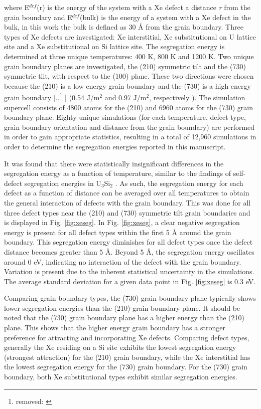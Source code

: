 \documentclass[review]{elsarticle}
\providecommand{\DIFaddtex}[1]{{\protect\color{blue} \sf #1}} %
\providecommand{\DIFdeltex}[1]{{\protect\color{red} [..\footnote{removed: #1} ]}} %
\providecommand{\DIFaddbegin}{} %
\providecommand{\DIFaddend}{} %
\providecommand{\DIFdelbegin}{} %
\providecommand{\DIFdelend}{} %
\providecommand{\DIFadd}[1]{\texorpdfstring{\DIFaddtex{#1}}{#1}} %
\providecommand{\DIFdel}[1]{\texorpdfstring{\DIFdeltex{#1}}{}} %
\newcommand{\DIFscaledelfig}{0.5}
\newlength{\DIFdelgraphicswidth} %
\newlength{\DIFdelgraphicsheight} %
\newcommand{\DIFaddincludegraphics}[2][]{{\color{blue}\fbox{\DIFOincludegraphics[#1]{#2}}}} %
\newcommand{\DIFdelincludegraphics}[2][]{%
\sbox{\DIFdelgraphicsbox}{\DIFOincludegraphics[#1]{#2}}%
\settoboxwidth{\DIFdelgraphicswidth}{\DIFdelgraphicsbox} %
\settoboxtotalheight{\DIFdelgraphicsheight}{\DIFdelgraphicsbox} %
\scalebox{\DIFscaledelfig}{%
\parbox[b]{\DIFdelgraphicswidth}{\usebox{\DIFdelgraphicsbox}\\[-\baselineskip] \rule{\DIFdelgraphicswidth}{0em}}\llap{\resizebox{\DIFdelgraphicswidth}{\DIFdelgraphicsheight}{%
\setlength{\unitlength}{\DIFdelgraphicswidth}%
\begin{picture}(1,1)%
\thicklines\linethickness{2pt} %
{\color[rgb]{1,0,0}\put(0,0){\framebox(1,1){}}}%
{\color[rgb]{1,0,0}\put(0,0){\line( 1,1){1}}}%
{\color[rgb]{1,0,0}\put(0,1){\line(1,-1){1}}}%
\end{picture}%
}\hspace*{3pt}}} %
} %
\DeclareRobustCommand{\DIFaddbegin}{\DIFOaddbegin \let\includegraphics\DIFaddincludegraphics} %
\DeclareRobustCommand{\DIFaddend}{\DIFOaddend \let\includegraphics\DIFOincludegraphics} %
\DeclareRobustCommand{\DIFdelbegin}{\DIFOdelbegin \let\includegraphics\DIFdelincludegraphics} %
\DeclareRobustCommand{\DIFdelend}{\DIFOaddend \let\includegraphics\DIFOincludegraphics} %
\begin{document}
where E$^{def}$(r) is the energy of the system with a Xe defect a distance \textit{r} from the grain boundary and E$^{def}$(bulk) is the energy of a system with a Xe defect in the bulk, in this work the bulk is defined as 30 {\AA} from the grain boundary. Three types of Xe defects are investigated: Xe interstitial, Xe substitutional on U lattice site and a Xe substitutional on Si lattice site. The segregation energy is determined at three unique temperatures: 400 K, 800 K and 1200 K. Two unique grain boundary planes are investigated, the (210) symmetric tilt and the (730) symmetric tilt, with respect to the (100) plane. These two directions were chosen because the (210) is a low energy grain boundary and the (730) is a high energy grain boundary \DIFdelbegin \DIFdel{\cite{beeler_usi_gb}}\DIFdelend \DIFaddbegin \DIFadd{(0.54 J/m$^2$ and 0.97 J/m$^2$, respectively \cite{beeler_usi_gb})}\DIFaddend . The simulation supercell consists of 4800 atoms for the (210) and 6960 atoms for the (730) grain boundary plane. Eighty unique simulations (for each temperature, defect type, grain boundary orientation and distance from the grain boundary) are performed in order to gain appropriate statistics, resulting in a total of 12,960 simulations in order to determine the segregation energies reported in this manuscript.

It was found that there were statistically insignificant differences in the segregation energy as a function of temperature, similar to the findings of self-defect segregation energies in U$_3$Si$_2$ \cite{beeler_usi_gb}. As such, the segregation energy for each defect as a function of distance can be averaged over all temperatures to obtain the general interaction of defects with the grain boundary. This was done for all three defect types near the (210) and (730) symmetric tilt grain boundaries and is displayed in Fig. \ref{fig:xeseg}. In Fig. \ref{fig:xeseg}, a clear negative segregation energy is present for all defect types within the first 5 {\AA} around the grain boundary. This segregation energy diminishes for all defect types once the defect distance becomes greater than 5 {\AA}. Beyond 5 {\AA}, the segregation energy oscillates around 0 eV, indicating no interaction of the defect with the grain boundary. Variation is present due to the inherent statistical uncertainty in the simulations. The average standard deviation for a given data point in Fig. \ref{fig:xeseg} is 0.3 eV.

Comparing grain boundary types, the (730) grain boundary plane typically shows lower segregation energies than the (210) grain boundary plane. It should be noted that the (730) grain boundary plane has a higher energy than the (210) plane. This shows that the higher energy grain boundary has a stronger preference for attracting and incorporating Xe defects. Comparing defect types, generally the Xe residing on a Si site exhibits the lowest segregation energy (strongest attraction) for the (210) grain boundary, while the Xe interstitial has the lowest segregation energy for the (730) grain boundary. For the (730) grain boundary, both Xe substitutional types exhibit similar segregation energies. 
\end{document}
